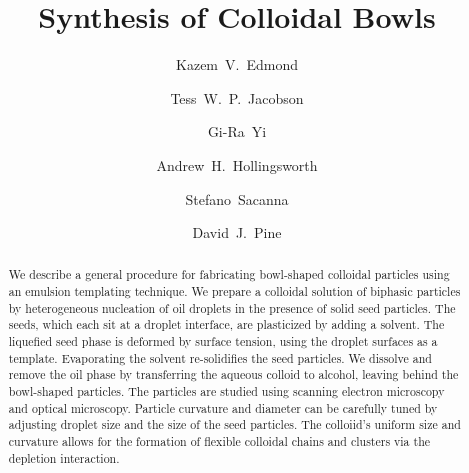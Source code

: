 \documentclass[aps,pre,preprint,superscriptaddress,nofootinbib]{revtex4-1}
\begin{document}

\title{Synthesis of Colloidal Bowls}
\author{Kazem~V.~Edmond}
\author{Tess~W.~P.~Jacobson}

\author{Gi-Ra~Yi}
\author{Andrew~H.~Hollingsworth}
\author{Stefano~Sacanna}
\author{David~J.~Pine}


\begin{abstract}

We describe a general procedure for fabricating bowl-shaped colloidal particles using an emulsion templating technique.
We prepare a colloidal solution of biphasic particles by heterogeneous nucleation of oil droplets in the presence of solid seed particles.
The seeds, which each sit at a droplet interface, are plasticized by adding a solvent.
The liquefied seed phase is deformed by surface tension, using the droplet surfaces as a template.
Evaporating the solvent re-solidifies the seed particles.
We dissolve and remove the oil phase by transferring the aqueous colloid to alcohol, leaving behind the bowl-shaped particles.
The particles are studied using scanning electron microscopy and optical microscopy.
Particle curvature and diameter can be carefully tuned by adjusting droplet size and the size of the seed particles.
The colloiid's uniform size and curvature allows for the formation of flexible colloidal chains and clusters via the depletion interaction.

\end{abstract}
\maketitle
\end{document}
